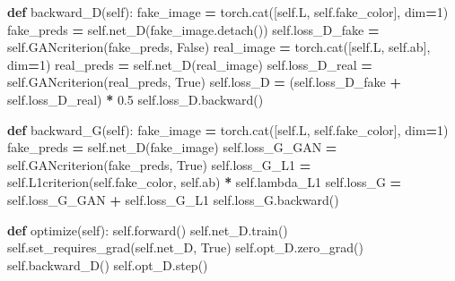 \documentclass[
]{article}
\newenvironment{Shaded}{\begin{snugshade}}{\end{snugshade}}
\newcommand{\DecValTok}[1]{\textcolor[rgb]{0.00,0.00,0.81}{#1}}
\newcommand{\FloatTok}[1]{\textcolor[rgb]{0.00,0.00,0.81}{#1}}
\newcommand{\KeywordTok}[1]{\textcolor[rgb]{0.13,0.29,0.53}{\textbf{#1}}}
\newcommand{\NormalTok}[1]{#1}
\newcommand{\OperatorTok}[1]{\textcolor[rgb]{0.81,0.36,0.00}{\textbf{#1}}}
\newcommand{\VariableTok}[1]{\textcolor[rgb]{0.00,0.00,0.00}{#1}}
\begin{document}
\begin{Shaded}
\begin{Highlighting}[]
    \KeywordTok{def}\NormalTok{ backward\_D(}\VariableTok{self}\NormalTok{):}
\NormalTok{        fake\_image }\OperatorTok{=}\NormalTok{ torch.cat([}\VariableTok{self}\NormalTok{.L, }\VariableTok{self}\NormalTok{.fake\_color], dim}\OperatorTok{=}\DecValTok{1}\NormalTok{)}
\NormalTok{        fake\_preds }\OperatorTok{=} \VariableTok{self}\NormalTok{.net\_D(fake\_image.detach())}
        \VariableTok{self}\NormalTok{.loss\_D\_fake }\OperatorTok{=} \VariableTok{self}\NormalTok{.GANcriterion(fake\_preds, }\VariableTok{False}\NormalTok{)}
\NormalTok{        real\_image }\OperatorTok{=}\NormalTok{ torch.cat([}\VariableTok{self}\NormalTok{.L, }\VariableTok{self}\NormalTok{.ab], dim}\OperatorTok{=}\DecValTok{1}\NormalTok{)}
\NormalTok{        real\_preds }\OperatorTok{=} \VariableTok{self}\NormalTok{.net\_D(real\_image)}
        \VariableTok{self}\NormalTok{.loss\_D\_real }\OperatorTok{=} \VariableTok{self}\NormalTok{.GANcriterion(real\_preds, }\VariableTok{True}\NormalTok{)}
        \VariableTok{self}\NormalTok{.loss\_D }\OperatorTok{=}\NormalTok{ (}\VariableTok{self}\NormalTok{.loss\_D\_fake }\OperatorTok{+} \VariableTok{self}\NormalTok{.loss\_D\_real) }\OperatorTok{*} \FloatTok{0.5}
        \VariableTok{self}\NormalTok{.loss\_D.backward()}
        
    \KeywordTok{def}\NormalTok{ backward\_G(}\VariableTok{self}\NormalTok{):}
\NormalTok{        fake\_image }\OperatorTok{=}\NormalTok{ torch.cat([}\VariableTok{self}\NormalTok{.L, }\VariableTok{self}\NormalTok{.fake\_color], dim}\OperatorTok{=}\DecValTok{1}\NormalTok{)}
\NormalTok{        fake\_preds }\OperatorTok{=} \VariableTok{self}\NormalTok{.net\_D(fake\_image)}
        \VariableTok{self}\NormalTok{.loss\_G\_GAN }\OperatorTok{=} \VariableTok{self}\NormalTok{.GANcriterion(fake\_preds, }\VariableTok{True}\NormalTok{)}
        \VariableTok{self}\NormalTok{.loss\_G\_L1 }\OperatorTok{=} \VariableTok{self}\NormalTok{.L1criterion(}\VariableTok{self}\NormalTok{.fake\_color, }\VariableTok{self}\NormalTok{.ab) }\OperatorTok{*} \VariableTok{self}\NormalTok{.lambda\_L1}
        \VariableTok{self}\NormalTok{.loss\_G }\OperatorTok{=} \VariableTok{self}\NormalTok{.loss\_G\_GAN }\OperatorTok{+} \VariableTok{self}\NormalTok{.loss\_G\_L1}
        \VariableTok{self}\NormalTok{.loss\_G.backward()}
    
    \KeywordTok{def}\NormalTok{ optimize(}\VariableTok{self}\NormalTok{):}
        \VariableTok{self}\NormalTok{.forward()}
        \VariableTok{self}\NormalTok{.net\_D.train()}
        \VariableTok{self}\NormalTok{.set\_requires\_grad(}\VariableTok{self}\NormalTok{.net\_D, }\VariableTok{True}\NormalTok{)}
        \VariableTok{self}\NormalTok{.opt\_D.zero\_grad()}
        \VariableTok{self}\NormalTok{.backward\_D()}
        \VariableTok{self}\NormalTok{.opt\_D.step()}
        

\end{Highlighting}
\end{Shaded}
\end{document}
